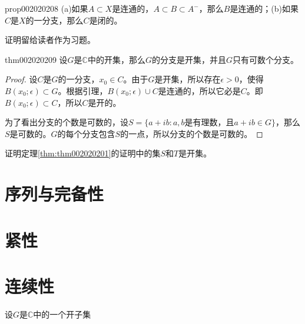\begin{proposition}{}{prop002020208}
(a)如果$A \subset X$是连通的，$A \subset B \subset A^-$，那么$B$是连通的；(b)如果$C$是$X$的一分支，那么$C$是闭的。
\end{proposition}

证明留给读者作为习题。

\begin{theorem}{}{thm002020209}
设$G$是$\mathbb{C}$中的开集，那么$G$的分支是开集，并且$G$只有可数个分支。 
\end{theorem}

\begin{proof}
设$C$是$G$的一分支，$x_0 \in C$。由于$G$是开集，所以存在$\epsilon > 0$，使得$B(x_0;\epsilon) \subset G$。根据引理，$B(x_0;\epsilon) \cup C$是连通的，所以它必是$C$。即$B(x_0;\epsilon) \subset C$，所以$C$是开的。

为了看出分支的个数是可数的，设$S = \{a + ib: a, b\text{是有理数，且}a+ib \in G\}$，那么$S$是可数的。$G$的每个分支包含$S$的一点，所以分支的个数是可数的。
\end{proof}


\begin{exercise}\label{exer002020202}
证明定理\ref{thm:thm002020201}的证明中的集$S$和$T$是开集。
\end{exercise}


\section{序列与完备性}\label{section0020203}

\section{紧性}\label{section0020204}

\section{连续性}\label{section0020205}

\begin{exercise}\label{exer002020507}
设$G$是$\mathbb{C}$中的一个开子集
\end{exercise}





